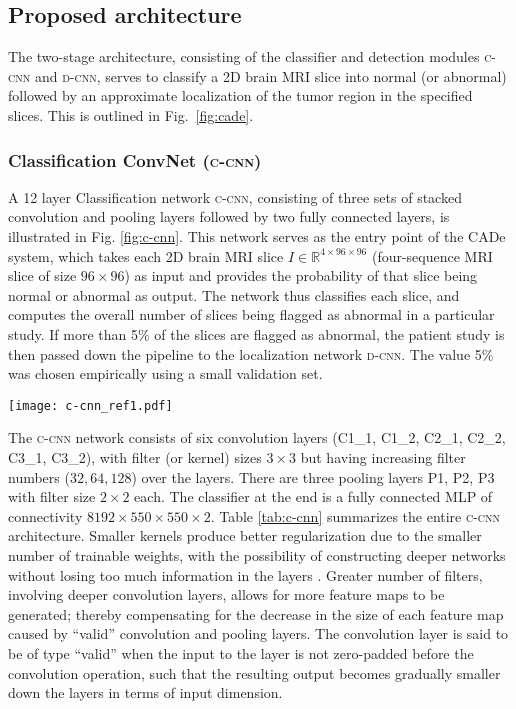 \documentclass[journal,twocolumn]{IEEEtran}
\begin{document}
\subsection{Proposed architecture}\label{baseline}
The two-stage architecture, consisting of the classifier and detection modules {\scshape{c-cnn}} and {\scshape{d-cnn}}, serves to classify a 2D brain MRI slice into normal (or abnormal) followed by an approximate localization of the tumor region in the specified slices. This is outlined in Fig.~\ref{fig:cade}.

\subsubsection{Classification ConvNet ({\scshape{c-cnn}})}
A 12 layer Classification network {\scshape{c-cnn}}, consisting of three sets of stacked convolution and pooling layers followed by two fully connected layers, is  illustrated in Fig. \ref{fig:c-cnn}. This network serves as the entry point of the CADe system, which takes each 2D brain MRI slice $I \in \mathbb{R}^{4 \times 96 \times 96}$ (four-sequence MRI slice of size $96 \times 96$) as input and provides the probability of that slice being normal or abnormal as output. The network thus classifies each slice, and computes  the overall number of slices being flagged as abnormal in a particular study. If more than 5\% of the slices are flagged as abnormal, the patient study is then passed down the pipeline to the  localization network {\scshape{d-cnn}}. The value 5\% was chosen empirically using a small validation set.

\begin{figure*}[]
\begin{center}
	\texttt{[image: c-cnn\_ref1.pdf]}
	\caption{Network {\scshape{c-cnn}}}
	\label{fig:c-cnn}
\end{center}
\end{figure*}

The {\scshape{c-cnn}} network consists of six convolution layers (C1\_1, C1\_2, C2\_1, C2\_2, C3\_1, C3\_2), with  filter (or kernel) sizes $3 \times 3$ but having increasing filter numbers ($32, 64, 128$) over the layers. There are three  pooling layers P1, P2, P3 with filter size $ 2 \times 2$ each.  The classifier at the end is a fully connected MLP of connectivity $8192 \times 550 \times 550 \times 2$. Table \ref{tab:c-cnn} summarizes the entire {\scshape{c-cnn}} architecture. Smaller kernels produce  better regularization  due to the smaller number of trainable weights,  with the possibility  of constructing  deeper networks  without losing too much information in the layers \cite{Pereira2016, Simonyan2014_verydeepcnn}. Greater number of  filters, involving deeper  convolution layers, allows for  more feature maps to be generated; thereby  compensating for the decrease in the size of each feature map caused by  ``valid'' convolution and pooling layers. The convolution layer is said  to be of type  ``valid'' when the input to the layer is not zero-padded before the convolution operation,  such that  the resulting output becomes gradually smaller  down the layers in terms  of input  dimension.
\end{document}
